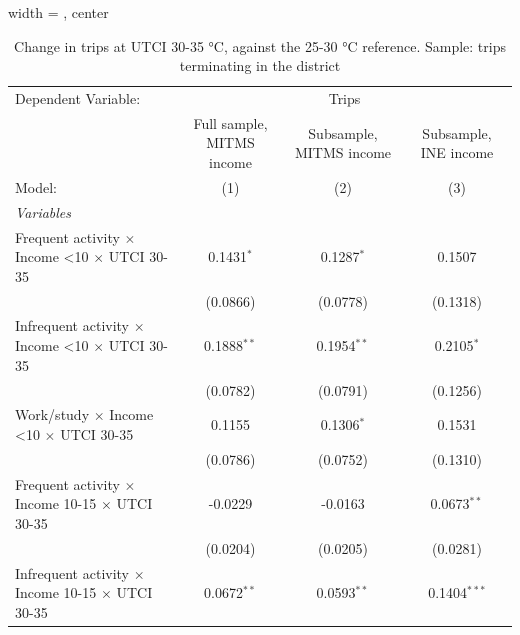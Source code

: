 
\begin{table}[htbp]
   \caption{\label{table_models_abc_terminating_30-35} Change in trips at UTCI 30-35 °C, against the 25-30 °C reference. Sample: trips terminating in the district}
   \centering
   \small
   \begin{adjustbox}{width = \textwidth, center}
      \begin{tabular}{lccc}
         \tabularnewline \midrule \midrule
         Dependent Variable: & \multicolumn{3}{c}{Trips}\\
                                                                         & Full sample, MITMS income & Subsample, MITMS income & Subsample, INE income \\   
         Model:                                                          & (1)                       & (2)                     & (3)\\  
         \midrule
         \emph{Variables}\\
         Frequent activity $\times$ Income <10 $\times$ UTCI 30-35       & 0.1431$^{*}$              & 0.1287$^{*}$            & 0.1507\\   
                                                                         & (0.0866)                  & (0.0778)                & (0.1318)\\   
         Infrequent activity $\times$ Income <10 $\times$ UTCI 30-35     & 0.1888$^{**}$             & 0.1954$^{**}$           & 0.2105$^{*}$\\   
                                                                         & (0.0782)                  & (0.0791)                & (0.1256)\\   
         Work/study $\times$ Income <10 $\times$ UTCI 30-35              & 0.1155                    & 0.1306$^{*}$            & 0.1531\\   
                                                                         & (0.0786)                  & (0.0752)                & (0.1310)\\   
         Frequent activity $\times$ Income 10-15 $\times$ UTCI 30-35     & -0.0229                   & -0.0163                 & 0.0673$^{**}$\\   
                                                                         & (0.0204)                  & (0.0205)                & (0.0281)\\   
         Infrequent activity $\times$ Income 10-15 $\times$ UTCI 30-35   & 0.0672$^{**}$             & 0.0593$^{**}$           & 0.1404$^{***}$\\   

\end{tabular}
\end{adjustbox}
\end{table}
